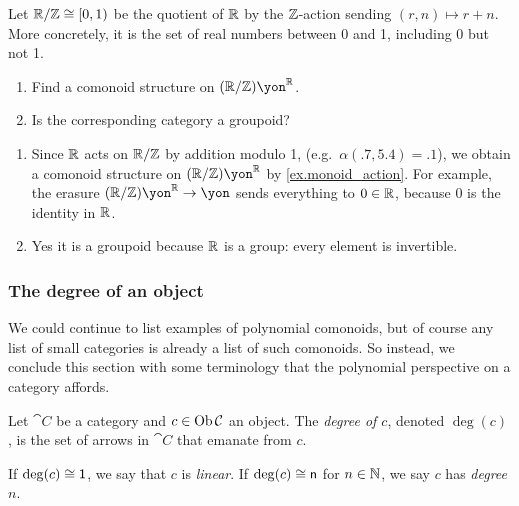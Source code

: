 \documentclass[Book-Poly]{subfiles}
\begin{document}
\begin{exercise}
Let $\mathbb{R}/\mathbb{Z}\cong[0,1)$ be the quotient of $\mathbb{R}$ by the $\mathbb{Z}$-action sending $(r,n)\mapsto r+n$. 
More concretely, it is the set of real numbers between 0 and 1, including 0 but not 1.
\begin{enumerate}
	\item Find a comonoid structure on $(\rr/\zz)\yon^\rr$.
	\item Is the corresponding category a groupoid?
\qedhere
\end{enumerate}
\begin{solution}
\begin{enumerate}
    \item Since $\mathbb{R}$ acts on $\mathbb{R}/\mathbb{Z}$ by addition modulo 1, (e.g.\ $\alpha(.7,5.4)=.1$), we obtain a comonoid structure on $(\rr/\zz)\yon^\rr$ by \cref{ex.monoid_action}. For example, the erasure $(\rr/\zz)\yon^\rr\to\yon$ sends everything to $0\in\mathbb{R}$, because $0$ is the identity in $\mathbb{R}$. 
    \item Yes it is a groupoid because $\mathbb{R}$ is a group: every element is invertible.
\end{enumerate}
\end{solution}
\end{exercise}


\subsubsection{The degree of an object}

We could continue to list examples of polynomial comonoids, but of course any list of small categories is already a list of such comonoids.
So instead, we conclude this section with some terminology that the polynomial perspective on a category affords.

\begin{definition}
Let $\cat{C}$ be a category and $c\in\operatorname{Ob}\mathcal{C}$ an object. The \emph{degree of $c$}, denoted $\deg(c)$, is the set of arrows in $\cat{C}$ that emanate from $c$.

If $\deg(c)\cong\textsf{1}$, we say that $c$ is \emph{linear}.
If $\deg(c)\cong\mathsf{n}$ for $n\in\mathbb{N}$, we say $c$ has \emph{degree $n$}.
\end{definition}
\end{document}
